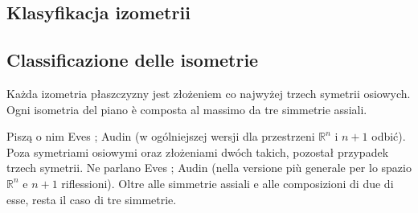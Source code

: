 
%

\subsection{Klasyfikacja izometrii} %
\subsection{Classificazione delle isometrie} %

\begin{theorem}
[Chasles'a, 1830] %
[di Chasles, 1830] %
\label{theorem_chasles}
    Każda izometria płaszczyzny jest złożeniem co najwyżej trzech symetrii osiowych. %
    Ogni isometria del piano è composta al massimo da tre simmetrie assiali. %
\end{theorem}



Piszą o nim Eves \cite[s. 113]{eves1_1972}; Audin \cite[s. 49]{audin_2003} (w ogólniejszej wersji dla przestrzeni $\mathbb R^n$ i $n+1$ odbić). %
Poza symetriami osiowymi oraz złożeniami dwóch takich, pozostał przypadek trzech symetrii. %
Ne parlano Eves \cite[s. 113]{eves1_1972}; Audin \cite[s. 49]{audin_2003} (nella versione più generale per lo spazio $\mathbb R^n$ e $n+1$ riflessioni). %
Oltre alle simmetrie assiali e alle composizioni di due di esse, resta il caso di tre simmetrie. %

